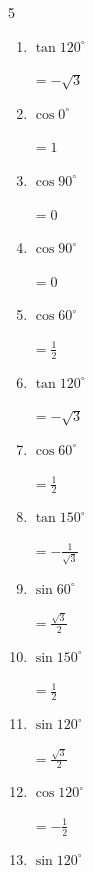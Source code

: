 \begin{multicols}{5}
\begin{enumerate}
        $\displaystyle なし$

  \item $\displaystyle \tan{120^\circ}$

        $\displaystyle =-\sqrt{3}$

  \item $\displaystyle \cos{0^\circ}$

        $\displaystyle =1$

  \item $\displaystyle \cos{90^\circ}$

        $\displaystyle =0$

\columnbreak %

  \item $\displaystyle \cos{90^\circ}$

        $\displaystyle =0$

  \item $\displaystyle \cos{60^\circ}$

        $\displaystyle =\frac{1}{2}$

  \item $\displaystyle \tan{120^\circ}$

        $\displaystyle =-\sqrt{3}$

  \item $\displaystyle \cos{60^\circ}$

        $\displaystyle =\frac{1}{2}$

  \item $\displaystyle \tan{150^\circ}$

        $\displaystyle =-\frac{1}{\sqrt{3}}$

  \item $\displaystyle \sin{60^\circ}$

        $\displaystyle =\frac{\sqrt{3}}{2}$

  \item $\displaystyle \sin{150^\circ}$

        $\displaystyle =\frac{1}{2}$

  \item $\displaystyle \sin{120^\circ}$

        $\displaystyle =\frac{\sqrt{3}}{2}$

  \item $\displaystyle \cos{120^\circ}$

        $\displaystyle =-\frac{1}{2}$

  \item $\displaystyle \sin{120^\circ}$


\end{enumerate}
\end{multicols}
